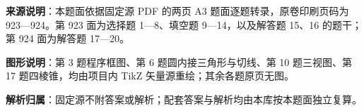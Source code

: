 

\begin{gknotice}
\textbf{来源说明}：本题面依据固定源 PDF 的两页 A3 题面逐题转录，原卷印刷页码为 923—924。第 923 面为选择题 1—8、填空题 9—14，以及解答题 15、16 的题干；第 924 面为解答题 17—20。

\textbf{图形说明}：第 3 题程序框图、第 6 题圆内接三角形与切线、第 10 题三视图、第 17 题四棱锥，均由项目内 TikZ 矢量源重绘；其余各题原页无图。

\textbf{解析归属}：固定源不附答案或解析；配套答案与解析均由本库按本题面独立复算。
\end{gknotice}


